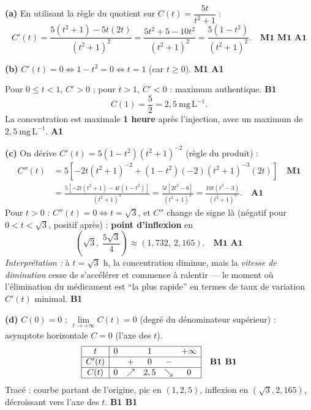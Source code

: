 \documentclass[11pt]{article}
\begin{document}
\begin{corrige}
\textbf{(a)} En utilisant la règle du quotient sur $C(t) = \dfrac{5t}{t^2+1}$ :
\[
C'(t) = \frac{5(t^2+1) - 5t(2t)}{(t^2+1)^2} = \frac{5t^2 + 5 - 10t^2}{(t^2+1)^2} = \frac{5(1 - t^2)}{(t^2+1)^2}. \quad \textbf{M1 M1 A1}
\]

\textbf{(b)} $C'(t) = 0 \iff 1 - t^2 = 0 \iff t = 1$ (car $t \ge 0$). \hfill \textbf{M1 A1}

Pour $0 \le t < 1$, $C' > 0$ ; pour $t > 1$, $C' < 0$ : maximum authentique. \hfill \textbf{B1}
\[
C(1) = \frac{5}{2} = 2,5\ \mathrm{mg\,L^{-1}}.
\]
La concentration est maximale \textbf{1 heure} après l'injection, avec un maximum de $2,5\ \mathrm{mg\,L^{-1}}$. \hfill \textbf{A1}

\textbf{(c)} On dérive $C'(t) = 5(1-t^2)(t^2+1)^{-2}$ (règle du produit) :
\begin{align*}
C''(t) &= 5\left[ -2t(t^2+1)^{-2} + (1-t^2)(-2)(t^2+1)^{-3}(2t) \right] \quad \textbf{M1}\\
&= \frac{5\left[ -2t(t^2+1) - 4t(1-t^2) \right]}{(t^2+1)^3}
= \frac{5t\left[ 2t^2 - 6 \right]}{(t^2+1)^3}
= \frac{10t(t^2 - 3)}{(t^2+1)^3}. \quad \textbf{A1}
\end{align*}
Pour $t > 0$ : $C''(t) = 0 \iff t = \sqrt{3}$, et $C''$ change de signe là (négatif pour $0 < t < \sqrt3$, positif après) : \textbf{point d'inflexion} en
\[
\left( \sqrt{3},\ \frac{5\sqrt{3}}{4} \right) \approx (1,732,\ 2,165). \quad \textbf{M1 A1}
\]
\emph{Interprétation :} à $t = \sqrt{3}$ h, la concentration diminue, mais la \emph{vitesse de diminution} cesse de s'accélérer et commence à ralentir --- le moment où l'élimination du médicament est ``la plus rapide'' en termes de taux de variation $C'(t)$ minimal. \hfill \textbf{B1}

\textbf{(d)} $C(0) = 0$ ; $\lim\limits_{t\to+\infty} C(t) = 0$ (degré du dénominateur supérieur) : asymptote horizontale $C = 0$ (l'axe des $t$).
\[
\begin{array}{|c|ccccc|}
\hline
t & 0 & & 1 & & +\infty \\
\hline
C'(t) & & + & 0 & - & \\
\hline
C(t) & 0 & \nearrow & 2,5 & \searrow & 0 \\
\hline
\end{array} \quad \textbf{B1 B1}
\]
Tracé : courbe partant de l'origine, pic en $(1, 2,5)$, inflexion en $(\sqrt3, 2,165)$, décroissant vers l'axe des $t$. \hfill \textbf{B1 B1}


\end{corrige}
\end{document}
